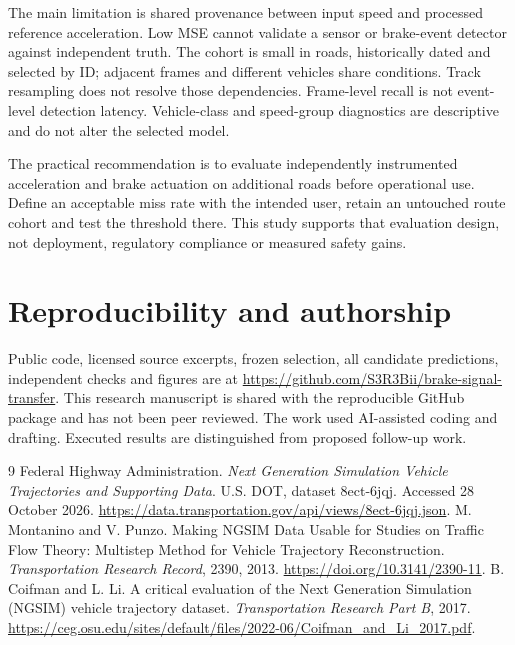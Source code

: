 \documentclass[11pt]{article}
\begin{document}
The main limitation is shared provenance between input speed and processed reference acceleration. Low MSE cannot validate a sensor or brake-event detector against independent truth. The cohort is small in roads, historically dated and selected by ID; adjacent frames and different vehicles share conditions. Track resampling does not resolve those dependencies. Frame-level recall is not event-level detection latency. Vehicle-class and speed-group diagnostics are descriptive and do not alter the selected model.

The practical recommendation is to evaluate independently instrumented acceleration and brake actuation on additional roads before operational use. Define an acceptable miss rate with the intended user, retain an untouched route cohort and test the threshold there. This study supports that evaluation design, not deployment, regulatory compliance or measured safety gains.

\section*{Reproducibility and authorship}
Public code, licensed source excerpts, frozen selection, all candidate predictions, independent checks and figures are at \url{https://github.com/S3R3Bii/brake-signal-transfer}. This research manuscript is shared with the reproducible GitHub package and has not been peer reviewed. The work used AI-assisted coding and drafting. Executed results are distinguished from proposed follow-up work.

\begin{thebibliography}{9}
 Federal Highway Administration. \emph{Next Generation Simulation Vehicle Trajectories and Supporting Data}. U.S. DOT, dataset 8ect-6jqj. Accessed 28 October 2026. \url{https://data.transportation.gov/api/views/8ect-6jqj.json}.
 M. Montanino and V. Punzo. Making NGSIM Data Usable for Studies on Traffic Flow Theory: Multistep Method for Vehicle Trajectory Reconstruction. \emph{Transportation Research Record}, 2390, 2013. \url{https://doi.org/10.3141/2390-11}.
 B. Coifman and L. Li. A critical evaluation of the Next Generation Simulation (NGSIM) vehicle trajectory dataset. \emph{Transportation Research Part B}, 2017. \url{https://ceg.osu.edu/sites/default/files/2022-06/Coifman_and_Li_2017.pdf}.
\end{thebibliography}
\end{document}
